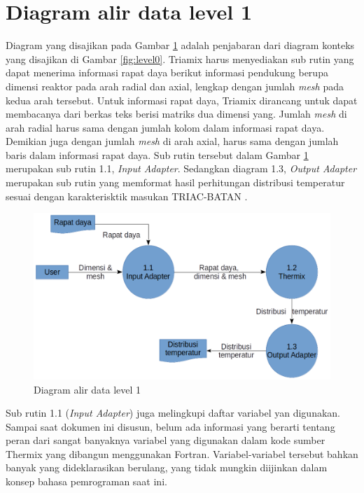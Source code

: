 \documentclass[a4paper,11pt]{report}
\begin{document}
\section{Diagram alir data level 1}
Diagram yang disajikan pada Gambar \ref{fig:level1} adalah penjabaran dari diagram konteks yang disajikan di Gambar \ref{fig:level0}. Triamix harus menyediakan sub rutin yang dapat menerima informasi rapat daya berikut informasi pendukung berupa dimensi reaktor pada arah radial dan
axial, lengkap dengan jumlah \textit{mesh} pada kedua arah tersebut. Untuk informasi rapat daya, Triamix dirancang untuk dapat membacanya dari berkas teks berisi matriks dua dimensi yang. Jumlah \textit{mesh} di arah radial harus sama dengan jumlah kolom dalam informasi rapat daya. Demikian juga dengan jumlah \textit{mesh} di arah axial, harus sama dengan jumlah baris dalam informasi rapat daya. Sub rutin tersebut dalam Gambar \ref{fig:level1} merupakan sub rutin 1.1, \textit{Input Adapter}. Sedangkan diagram 1.3, \textit{Output Adapter} merupakan sub rutin yang
memformat hasil perhitungan distribusi temperatur sesuai dengan karakterisktik masukan TRIAC-BATAN \cite{triac1}.

\begin{figure}[h!]
  \begin{center}
    \includegraphics[scale=.5]{pics/level1.png}
    \caption{Diagram alir data level 1}
    \label{fig:level1}
  \end{center}
\end{figure}

Sub rutin 1.1 (\textit{Input Adapter}) juga melingkupi daftar variabel yan digunakan. Sampai saat dokumen ini disusun, belum ada informasi yang berarti tentang peran dari sangat banyaknya variabel yang digunakan dalam kode sumber Thermix yang dibangun menggunakan Fortran. Variabel-variabel tersebut bahkan banyak yang dideklarasikan berulang, yang tidak mungkin diijinkan dalam konsep bahasa pemrograman saat ini. 
\end{document}

